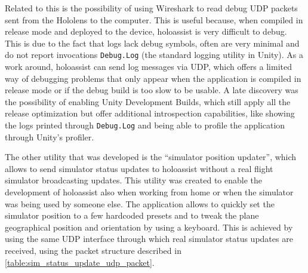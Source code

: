 Related to this is the possibility of using Wireshark to read debug \gls{UDP} packets sent from the Hololens to the computer. This is useful because, when compiled in release mode and deployed to the device, \gls{holoassist} is very difficult to debug. This is due to the fact that logs lack debug symbols, often are very minimal and do not report invocations \texttt{Debug.Log} (the standard logging utility in Unity). As a work around, \gls{holoassist} can send log messages via \gls{UDP}, which offers a limited way of debugging problems that only appear when the application is compiled in release mode or if the debug build is too slow to be usable. A late discovery was the possibility of enabling Unity Development Builds, which still apply all the release optimization but offer additional introspection capabilities, like showing the logs printed through \texttt{Debug.Log} and being able to profile the application through Unity's profiler.

The other utility that was developed is the \enquote{simulator position updater}, which allows to send simulator status updates to \gls{holoassist} without a real flight simulator broadcasting updates. This utility was created to enable the development of \gls{holoassist} also when working from home or when the simulator was being used by someone else. The application allows to quickly set the simulator position to a few hardcoded presets and to tweak the plane geographical position and orientation by using a keyboard. This is achieved by using the same \gls{UDP} interface through which real simulator status updates are received, using the packet structure described in \autoref{table:sim_status_update_udp_packet}. 